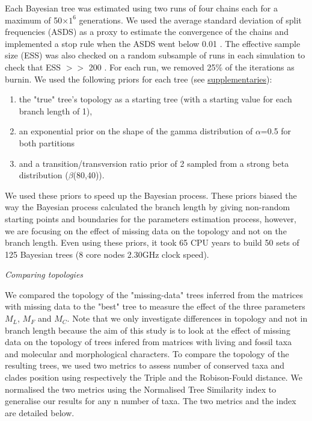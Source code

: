 \documentclass[12pt,letterpaper]{article}
\renewcommand{\subsection}[1]{%
\bigskip
\begin{center}
\begin{large}
\normalfont\itshape #1
\end{large}
\end{center}}
\begin{document}
Each Bayesian tree was estimated using two runs of four chains each for a maximum of 50$\times$$1^6$ generations.
We used the average standard deviation of split frequencies (ASDS) as a proxy to estimate the convergence of the chains and implemented a stop rule when the ASDS went below 0.01 \citep{Ronquist2012mrbayes}.
The effective sample size (ESS) was also checked on a random subsample of runs in each simulation to check that ESS $>>$ 200 \citep{drummond2006ess}.
For each run, we removed 25\% of the iterations as burnin. We used the following priors for each tree (see \hyperref[supplementaries]{supplementaries}):
\begin{enumerate}
\item
the "true" tree’s topology as a starting tree (with a starting value for each branch length of 1),
\item
an exponential prior on the shape of the gamma distribution of $\alpha$=0.5 for both partitions
\item
and a transition/transversion ratio prior of 2 sampled from a strong beta distribution ($\beta$(80,40)).
\end{enumerate}

We used these priors to speed up the Bayesian process.
These priors biased the way the Bayesian process calculated the branch length by giving non-random starting points and boundaries for the parameters estimation process, however, we are focusing on the effect of missing data on the topology and not on the branch length.
Even using these priors, it took 65 CPU years to build 50 sets of 125 Bayesian trees (8 core nodes 2.30GHz clock speed).

\subsection{Comparing topologies}
We compared the topology of the "missing-data" trees inferred from the matrices with missing data to the "best" tree to measure the effect of the three parameters $M_{L}$, $M_{F}$ and $M_{C}$.
Note that we only investigate differences in topology and not in branch length because the aim of this study is to look at the effect of missing data on the topology of trees infered from matrices with living and fossil taxa and molecular and morphological characters.
To compare the topology of the resulting trees, we used two metrics to assess number of conserved taxa and clades position using respectively the Triple \citep{dobson1975triplets} and the Robison-Fould \citep{RF1981} distance.
We normalised the two metrics using the Normalised Tree Similarity index \citep{Bogdanowicz2012} to generalise our results for any n number of taxa. The two metrics and the index are detailed below.
\end{document}
